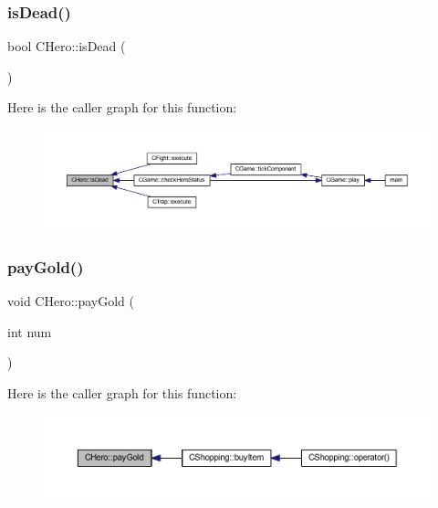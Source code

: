 \subsubsection{\texorpdfstring{is\+Dead()}{isDead()}}
{\footnotesize\ttfamily bool C\+Hero\+::is\+Dead (\begin{DoxyParamCaption}{ }\end{DoxyParamCaption})\hspace{0.3cm}{\ttfamily [inline]}}

Here is the caller graph for this function\+:\nopagebreak
\begin{figure}[H]
\begin{center}
\leavevmode
\includegraphics[width=350pt]{class_c_hero_acf265a146732ccfe08db87b6cc69cef3_icgraph}
\end{center}
\end{figure}
\mbox{\label{class_c_hero_a8568163de8d05b40e5c0b1d878472fd4}} 
\subsubsection{\texorpdfstring{pay\+Gold()}{payGold()}}
{\footnotesize\ttfamily void C\+Hero\+::pay\+Gold (\begin{DoxyParamCaption}\item[{int}]{num }\end{DoxyParamCaption})\hspace{0.3cm}{\ttfamily [inline]}}

Here is the caller graph for this function\+:\nopagebreak
\begin{figure}[H]
\begin{center}
\leavevmode
\includegraphics[width=350pt]{class_c_hero_a8568163de8d05b40e5c0b1d878472fd4_icgraph}
\end{center}
\end{figure}
\mbox{\label{class_c_hero_a0232f04b4e49227ba90a8922135d4102}} 
